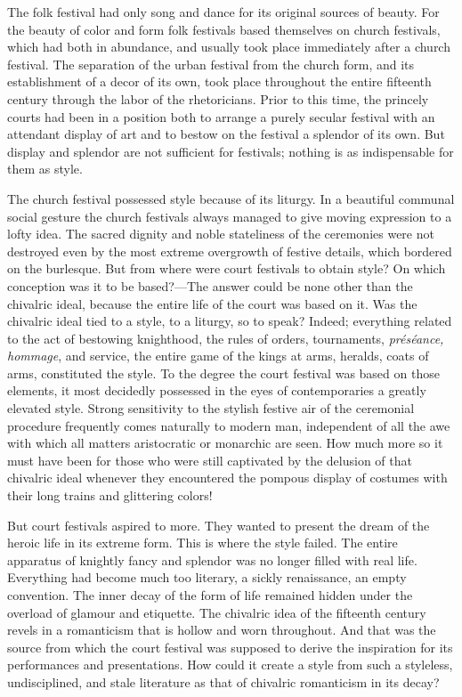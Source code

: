 The folk festival had only song and dance for its original sources of
beauty. For the beauty of color and form folk festivals based themselves
on church festivals, which had both in abundance, and usually took place
immediately after a church festival. The separation of the urban
festival from the church form, and its establishment of a decor of its
own, took place throughout the entire
fif\protect\hypertarget{20_ILLUSTRATIONS_FOLLOW_PAGE.xhtmlux5cux23page_304}{}{}teenth
century through the labor of the rhetoricians. Prior to this time, the
princely courts had been in a position both to arrange a purely secular
festival with an attendant display of art and to bestow on the festival
a splendor of its own. But display and splendor are not sufficient for
festivals; nothing is as indispensable for them as style.

The church festival possessed style because of its liturgy. In a
beautiful communal social gesture the church festivals always managed to
give moving expression to a lofty idea. The sacred dignity and noble
stateliness of the ceremonies were not destroyed even by the most
extreme overgrowth of festive details, which bordered on the burlesque.
But from where were court festivals to obtain style? On which conception
was it to be based?---The answer could be none other than the chivalric
ideal, because the entire life of the court was based on it. Was the
chivalric ideal tied to a style, to a liturgy, so to speak? Indeed;
everything related to the act of bestowing knighthood, the rules of
orders, tournaments, \emph{préséance, hommage}, and service, the entire
game of the kings at arms, heralds, coats of arms, constituted the
style. To the degree the court festival was based on those elements, it
most decidedly possessed in the eyes of contemporaries a greatly
elevated style. Strong sensitivity to the stylish festive air of the
ceremonial procedure frequently comes naturally to modern man,
independent of all the awe with which all matters aristocratic or
monarchic are seen. How much more so it must have been for those who
were still captivated by the delusion of that chivalric ideal whenever
they encountered the pompous display of costumes with their long trains
and glittering colors!

But court festivals aspired to more. They wanted to present the dream of
the heroic life in its extreme form. This is where the style failed. The
entire apparatus of knightly fancy and splendor was no longer filled
with real life. Everything had become much too literary, a sickly
renaissance, an empty convention. The inner decay of the form of life
remained hidden under the overload of glamour and etiquette. The
chivalric idea of the fifteenth century revels in a romanticism that is
hollow and worn throughout. And that was the source from which the court
festival was supposed to derive the inspiration for its performances and
presentations. How could it create a style from such a styleless,
undisciplined, and stale literature as that of chivalric romanticism in
its decay?

